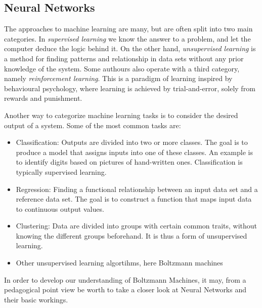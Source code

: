 \documentclass[%
oneside,                 %
final,                   %
10pt]{article}
\begin{document}
\subsection{Neural Networks}



The approaches to machine learning are many, but are often split into two main categories. 
In \emph{supervised learning} we know the answer to a problem,
and let the computer deduce the logic behind it. On the other hand, \emph{unsupervised learning}
is a method for finding patterns and relationship in data sets without any prior knowledge of the system.
Some authours also operate with a third category, namely \emph{reinforcement learning}. This is a paradigm 
of learning inspired by behavioural psychology, where learning is achieved by trial-and-error, 
solely from rewards and punishment.

Another way to categorize machine learning tasks is to consider the desired output of a system.
Some of the most common tasks are:

\begin{itemize}
  \item Classification: Outputs are divided into two or more classes. The goal is to   produce a model that assigns inputs into one of these classes. An example is to identify  digits based on pictures of hand-written ones. Classification is typically supervised learning.

  \item Regression: Finding a functional relationship between an input data set and a reference data set.   The goal is to construct a function that maps input data to continuous output values.

  \item Clustering: Data are divided into groups with certain common traits, without knowing the different groups beforehand.  It is thus a form of unsupervised learning.

  \item Other unsupervised learning algortihms, here Boltzmann machines
\end{itemize}

\noindent
In order to develop our understanding of Boltzmann Machines, it may, from a pedagogical point view be worth to take a closer look at Neural Networks and their basic workings. 
\end{document}

